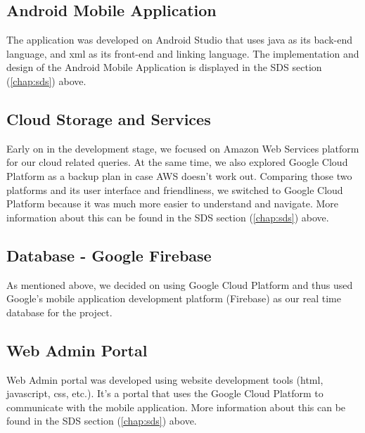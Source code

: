 \subsection{Android Mobile Application}
The application was developed on Android Studio that uses java as its back-end language, and xml as its front-end and linking language. The implementation and design of the Android Mobile Application is displayed in the SDS section (\ref{chap:sds}) above.
\subsection{Cloud Storage and Services}
Early on in the development stage, we focused on Amazon Web Services platform for our cloud related queries. At the same time, we also explored Google Cloud Platform as a backup plan in case AWS doesn't work out. Comparing those two platforms and its user interface and friendliness, we switched to Google Cloud Platform because it was much more easier to understand and navigate. More information about this can be found in the SDS section (\ref{chap:sds}) above.
\subsection{Database - Google Firebase}
As mentioned above, we decided on using Google Cloud Platform and thus used Google's mobile application development platform (Firebase) as our real time database for the project.
\subsection{Web Admin Portal}
Web Admin portal was developed using website development tools (html, javascript, css, etc.). It's a portal that uses the Google Cloud Platform to communicate with the mobile application.  More information about this can be found in the SDS section (\ref{chap:sds}) above.

